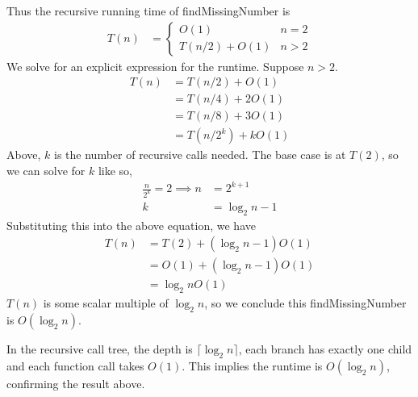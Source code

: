 \documentclass[11pt,a4paper]{article} %
\begin{document}
Thus the recursive running time of findMissingNumber
is
\begin{align*}
    T(n) &= \begin{cases}
        O(1) & n = 2 \\ 
        T(n/2) + O(1) & n > 2
    \end{cases}
\end{align*}
We solve for an explicit expression for the runtime. Suppose $n > 2$.
\begin{align*}
    T(n) &= T(n/2) + O(1) \\ 
    &= T(n/4) + 2O(1) \\ 
    &= T(n/8) + 3O(1) \\
    &= T(n/2^k) + kO(1)
\end{align*}
Above, $k$ is the number of recursive calls needed. The base case is at $T(2)$, 
so we can solve for $k$ like so,
\begin{align*}
    \frac{n}{2^k} = 2 \implies n &= 2^{k+1} \\ 
    k &= \log_2 n - 1
\end{align*}
Substituting this into the above equation, we have 
\begin{align*}
    T(n) &= T(2) + (\log_2 n - 1)O(1) \\ 
    &= O(1)+ (\log_2 n - 1)O(1) \\ 
    &= \log_2 n O(1)
\end{align*}
$T(n)$ is some scalar multiple of $\log_2 n$, so we conclude this 
findMissingNumber is $O(\log_2 n)$.

In the recursive call tree, the depth is $\lceil \log_2 n \rceil$,
each branch has exactly one child and each function call takes $O(1)$. This implies the runtime is $O(\log_2 n)$,
confirming the result above.
\end{document}
